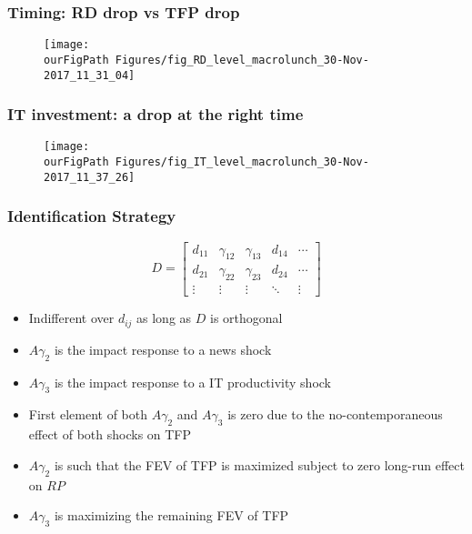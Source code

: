 \documentclass{beamer}
\def \ourFigPath {../../}
\begin{document}
\begin{frame}
	\frametitle{Timing: RD drop vs TFP drop}
	\label{timing}
	
	\vspace{-1cm}
	\noindent
	\begin{figure}
		\centering
		\texttt{[image: \\ourFigPath Figures/fig\_RD\_level\_macrolunch\_30-Nov-2017\_11\_31\_04]}
	\end{figure}

	
\hyperlink{convincing}{}	
\end{frame}

\begin{frame}
	\frametitle{IT investment: a drop at the right time}
	\label{it_investment}
	
	\noindent
	\begin{figure}
		\centering
		\texttt{[image: \\ourFigPath Figures/fig\_IT\_level\_macrolunch\_30-Nov-2017\_11\_37\_26]}
	\end{figure}

	
\hyperlink{convincing}{}	
\end{frame}

\begin{frame}
\frametitle{Identification Strategy}
\label{Technicalities}

\begin{equation}
D = \begin{bmatrix}
d_{11} & \gamma_{12} & \gamma_{13} & d_{14} & \cdots \\
d_{21} & \gamma_{22} & \gamma_{23} & d_{24} & \cdots \\
\vdots & \vdots & \vdots & \ddots & \vdots 
\end{bmatrix}
\end{equation}

\begin{itemize}
	\item Indifferent over $d_{ij}$ as long as $D$ is orthogonal
	\item $A \gamma_{2}$ is the impact response to a news shock
	\item $A \gamma_{3}$ is the impact response to a IT productivity shock
	\item First element of both $A \gamma_{2}$ and $A \gamma_{3}$ is zero due to the no-contemporaneous effect of both shocks on TFP
	\item $A \gamma_2$ is such that the FEV of TFP is maximized subject to zero long-run effect on $RP$
	\item $A \gamma_3$ is maximizing the remaining FEV of TFP 
\end{itemize} 


\hyperlink{identification}{}	
\end{frame}
	
	
\end{document}
